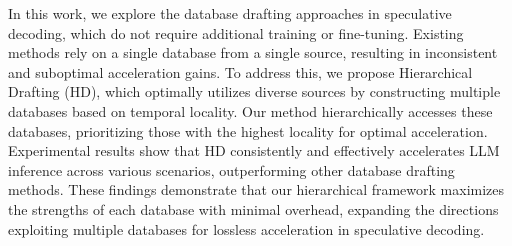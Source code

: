 In this work, we explore the database drafting approaches in speculative decoding, which do not require additional training or fine-tuning. Existing methods rely on a single database from a single source, resulting in inconsistent and suboptimal acceleration gains. To address this, we propose Hierarchical Drafting (HD), which optimally utilizes diverse sources by constructing multiple databases based on temporal locality. Our method hierarchically accesses these databases, prioritizing those with the highest locality for optimal acceleration. Experimental results show that HD consistently and effectively accelerates LLM inference across various scenarios, outperforming other database drafting methods. These findings demonstrate that our hierarchical framework maximizes the strengths of each database with minimal overhead, expanding the directions exploiting multiple databases for lossless acceleration in speculative decoding.